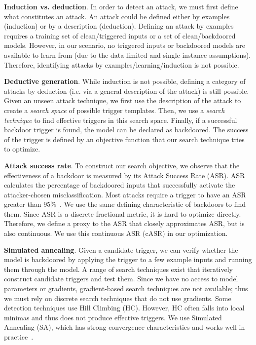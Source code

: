 \documentclass[letterpaper,twocolumn,10pt]{article}
\begin{document}
\textbf{Induction vs. deduction}. In order to detect an attack, we must first define what constitutes an attack. An attack could be defined either by examples (induction) or by a description (deduction). Defining an attack by examples requires a training set of clean/triggered inputs or a set of clean/backdoored models. However, in our scenario, no triggered inputs or backdoored models are available to learn from (due to the data-limited and single-instance assumptions). Therefore, identifying attacks by examples/learning/induction is not possible.

\textbf{Deductive generation}. While induction is not possible, defining a category of attacks by deduction (i.e. via a general description of the attack) is still possible. Given an unseen attack technique, we first use the description of the attack to create a \textit{search space} of possible trigger templates. Then, we use a \textit{search technique} to find effective triggers in this search space. Finally, if a successful backdoor trigger is found, the model can be declared as backdoored. The success of the trigger is defined by an objective function that our search technique tries to optimize.

\textbf{Attack success rate}. To construct our search objective, we observe that the effectiveness of a backdoor is measured by its Attack Success Rate (ASR). ASR calculates the percentage of backdoored inputs that successfully activate the attacker-chosen misclassification. Most attacks require a trigger to have an ASR greater than $95\%$~\cite{li2022survey}. We use the same defining characteristic of backdoors to find them. Since ASR is a discrete fractional metric, it is hard to optimize directly. Therefore, we define a proxy to the ASR that closely approximates ASR, but is also continuous. We use this continuous ASR (cASR) in our optimization.

\textbf{Simulated annealing}. Given a candidate trigger, we can verify whether the model is backdoored by applying the trigger to a few example inputs and running them through the model. A range of search techniques exist that iteratively construct candidate triggers and test them. Since we have no access to model parameters or gradients, gradient-based search techniques are not available; thus we must rely on discrete search techniques that do not use gradients. Some detection techniques use Hill Climbing (HC). However, HC often falls into local minimas and thus does not produce effective triggers. We use Simulated Annealing (SA), which has strong convergence characteristics and works well in practice~\cite{simulatedann}.
\end{document}
